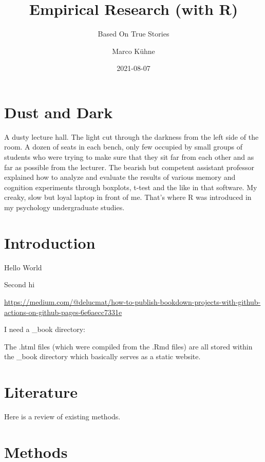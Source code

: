 \documentclass[
]{book}
\title{Empirical Research (with R)}
\subtitle{Based On True Stories}
\author{Marco Kühne}
\date{2021-08-07}
\begin{document}
\maketitle

{
\setcounter{tocdepth}{1}
\tableofcontents
}
\hypertarget{dust-and-dark}{%
\chapter*{Dust and Dark}\label{dust-and-dark}}

A dusty lecture hall. The light cut through the darkness from the left side of the room. A dozen of seats in each bench, only few occupied by small groups of students who were trying to make sure that they sit far from each other and as far as possible from the lecturer. The bearish but competent assistant professor explained how to analyze and evaluate the results of various memory and cognition experiments through boxplots, t-test and the like in that software. My creaky, slow but loyal laptop in front of me. That's where R was introduced in my psychology undergraduate studies.

\hypertarget{introduction}{%
\chapter{Introduction}\label{introduction}}

Hello World

Second hi

\url{https://medium.com/@delucmat/how-to-publish-bookdown-projects-with-github-actions-on-github-pages-6e6aecc7331e}

I need a \_book directory:

The .html files (which were compiled from the .Rmd files) are all stored within the \_book directory which basically serves as a static website.

\hypertarget{literature}{%
\chapter{Literature}\label{literature}}

Here is a review of existing methods.

\hypertarget{methods}{%
\chapter{Methods}\label{methods}}
\end{document}
